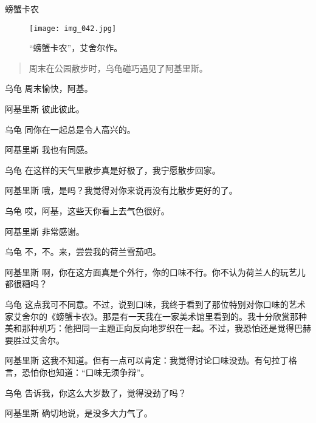\begin{dialog}{螃蟹卡农}

\begin{figure}
\texttt{[image: img\_042.jpg]}
\caption{“螃蟹卡农”，艾舍尔作。}
\end{figure}

\begin{quote}
周末在公园散步时，乌龟碰巧遇见了阿基里斯。
\end{quote}

\begin{dialogue}

\item[乌龟]周末愉快，阿基。

\item[阿基里斯]彼此彼此。

\item[乌龟]同你在一起总是令人高兴的。

\item[阿基里斯]我也有同感。

\item[乌龟]在这样的天气里散步真是好极了，我宁愿散步回家。

\item[阿基里斯]哦，是吗？我觉得对你来说再没有比散步更好的了。

\item[乌龟]哎，阿基，这些天你看上去气色很好。

\item[阿基里斯]非常感谢。

\item[乌龟]不，不。来，尝尝我的荷兰雪茄吧。

\item[阿基里斯]啊，你在这方面真是个外行，你的口味不行。你不认为荷兰人的玩艺儿都很糟吗？

\item[乌龟]这点我可不同意。不过，说到口味，我终于看到了那位特别对你口味的艺术家艾舍尔的《螃蟹卡农》。那是有一天我在一家美术馆里看到的。我十分欣赏那种美和那种机巧：他把同一主题正向反向地罗织在一起。不过，我恐怕还是觉得巴赫要胜过艾舍尔。

\item[阿基里斯]这我不知道。但有一点可以肯定：我觉得讨论口味没劲。有句拉丁格言，恐怕你也知道：“口味无须争辩”。

\item[乌龟]告诉我，你这么大岁数了，觉得没劲了吗？

\item[阿基里斯]确切地说，是没多大力气了。


\end{dialogue}
\end{dialog}
